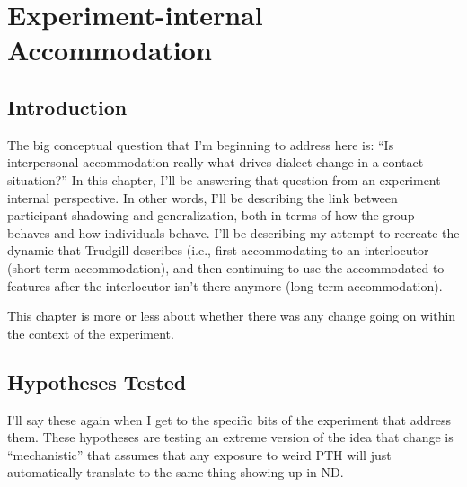 \chapter{Experiment-internal Accommodation}
\label{internalchapter}

\section{Introduction}
\label{sec:shadowingIntro}
The big conceptual question that I'm beginning to address here is: ``Is interpersonal accommodation really what drives dialect change in a contact situation?'' In this chapter, I'll be answering that question from an experiment-internal perspective. In other words, I'll be describing the link between participant shadowing and generalization, both in terms of how the group behaves and how individuals behave. I'll be describing my attempt to recreate the dynamic that Trudgill \citeyearpar{trudgill1986dialects} describes (i.e., first accommodating to an interlocutor (short-term accommodation), and then continuing to use the accommodated-to features after the interlocutor isn't there anymore (long-term accommodation).

This chapter is more or less about whether there was any change going on within the context of the experiment.

\section{Hypotheses Tested}
I'll say these again when I get to the specific bits of the experiment that address them. These hypotheses are testing an extreme version of the idea that change is ``mechanistic'' that assumes that any exposure to weird PTH will just automatically translate to the same thing showing up in ND.

